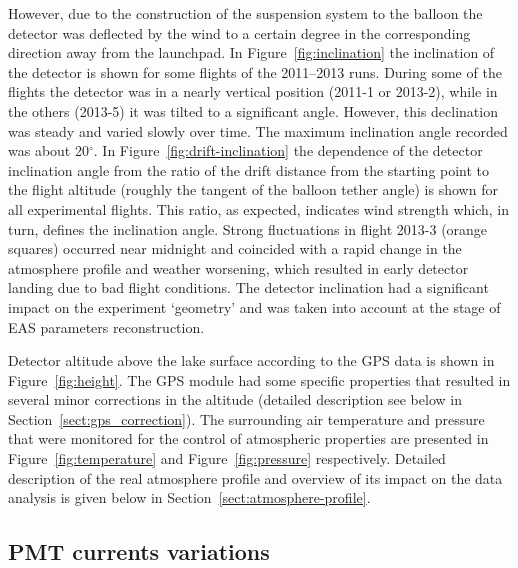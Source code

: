 \documentclass[universe,article,submit,moreauthors,pdftex]{Definitions/mdpi}
\begin{document}
\begin{paracol}{2}
However, due to the construction of the suspension system to the balloon the detector was deflected by the wind to a certain degree in the corresponding direction away from the launchpad. In Figure~\ref{fig:inclination} the inclination of the detector is shown for some flights of the 2011--2013 runs. During some of the flights the detector was in a nearly vertical position (2011-1 or 2013-2), while in the others (2013-5) it was tilted to a significant angle. However, this declination was steady and varied slowly over time. The maximum inclination angle recorded was about 20$^\circ$. In Figure~\ref{fig:drift-inclination} the dependence of the detector inclination angle from the ratio of the drift distance from the starting point to the flight altitude (roughly the tangent of the balloon tether angle) is shown for all experimental flights. This ratio, as expected, indicates wind strength which, in turn, defines the inclination angle. Strong fluctuations in flight 2013-3 (orange squares) occurred near midnight and coincided with a rapid change in the atmosphere profile and weather worsening, which resulted in early detector landing due to bad flight conditions. The detector inclination had a significant impact on the experiment `geometry' and was taken into account at the stage of EAS parameters reconstruction.

Detector altitude above the lake surface according to the GPS data is shown in Figure~\ref{fig:height}. The GPS module had some specific properties that resulted in several minor corrections in the altitude (detailed description see below in Section~\ref{sect:gps_correction}). The surrounding air temperature and pressure that were monitored for the control of atmospheric properties are presented in Figure~\ref{fig:temperature} and Figure~\ref{fig:pressure} respectively. Detailed description of the real atmosphere profile and overview of its impact on the data analysis is given below in Section~\ref{sect:atmosphere-profile}.



\subsection{PMT currents variations}



\end{paracol}
\end{document}
